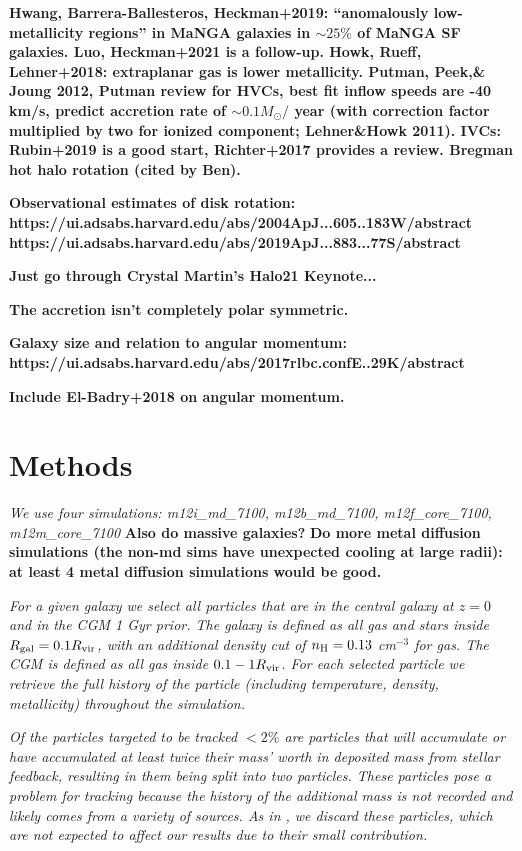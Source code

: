 \documentclass[fleqn,usenatbib]{mnras}
\begin{document}
\textbf{
Hwang, Barrera-Ballesteros, Heckman+2019: ``anomalously low-metallicity regions'' in MaNGA galaxies in $\sim 25\%$ of MaNGA SF galaxies. Luo, Heckman+2021 is a follow-up.
Howk, Rueff, Lehner+2018: extraplanar gas is lower metallicity.
Putman, Peek,\& Joung 2012, Putman review for HVCs, best fit inflow speeds are -40 km/s, predict accretion rate of $\sim 0.1 M_\odot/$ year (with correction factor multiplied by two for ionized component; Lehner\&Howk 2011).
IVCs: Rubin+2019 is a good start, Richter+2017 provides a review.
Bregman hot halo rotation (cited by Ben).
}

\textbf{
Observational estimates of disk rotation:
https://ui.adsabs.harvard.edu/abs/2004ApJ...605..183W/abstract
https://ui.adsabs.harvard.edu/abs/2019ApJ...883...77S/abstract
}

\textbf{Just go through Crystal Martin's Halo21 Keynote...}

\textbf{The accretion isn't completely polar symmetric.}

\textbf{Galaxy size and relation to angular momentum:
https://ui.adsabs.harvard.edu/abs/2017rlbc.confE..29K/abstract}

\textbf{
Include El-Badry+2018 on angular momentum.
}

\section{Methods}
\label{s: methods}

\textit{
We use four simulations:
m12i\_md\_7100, m12b\_md\_7100, m12f\_core\_7100, m12m\_core\_7100
}
\textbf{Also do massive galaxies?}
\textbf{Do more metal diffusion simulations (the non-md sims have unexpected cooling at large radii): at least 4 metal diffusion simulations would be good.}

\textit{
For a given galaxy we select all particles that are in the central galaxy at $z=0$ and in the CGM 1 Gyr prior.
The galaxy is defined as all gas and stars inside $R_{\rm gal} = 0.1 R_{\rm vir}$, with an additional density cut of $n_{\rm H} = 0.13$ cm$^{-3}$ for gas.
The CGM is defined as all gas inside $0.1 -1 R_{\rm vir}$.
For each selected particle we retrieve the full history of the particle (including temperature, density, metallicity) throughout the simulation.
}

\textit{
Of the particles targeted to be tracked $<2\%$ are particles that will accumulate or have accumulated at least twice their mass' worth in deposited mass from stellar feedback, resulting in them being split into two particles.
These particles pose a problem for tracking because the history of the additional mass is not recorded and likely comes from a variety of sources.
As in \cite{Hafen2019}, we discard these particles, which are not expected to affect our results due to their small contribution.
}
\end{document}

